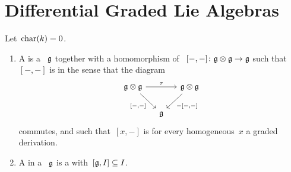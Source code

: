 \documentclass[a4paper,10pt,headings=standardclasses]{scrartcl}
\begin{document}
\pagebreak





\section{Differential Graded Lie Algebras}

Let~$\operatorname{char}(k) = 0$.


\begin{definition}
  \leavevmode
  \begin{enumerate}
    \item
      A  is a {\dgv}~$\mathfrak{g}$ together with a homomorphism of {\dgvs}~$[-,-] \colon \mathfrak{g} \otimes \mathfrak{g} \to \mathfrak{g}$ such that~$[-,-]$ is  in the sense that the diagram
      \[
        \begin{tikzcd}[column sep = small]
          \glie \tensor \glie
          \arrow{rr}[above]{\tau}
          \arrow{dr}[below left]{[-,-]}
          &
          {}
          &
          \glie \tensor \glie
          \arrow{dl}[below right]{-[-,-]}
          \\
          {}
          &
          \glie
          &
          {}
        \end{tikzcd}
      \]
      commutes, and such that~$[x,-]$ is for every homogeneous~$x$ a graded derivation.
    \item
      A {\dgli} in a {\dgl}~$\mathfrak{g}$ is a {\dgsub} with~$[\mathfrak{g}, I] \subseteq I$.
  \end{enumerate}
\end{definition}
\end{document}
